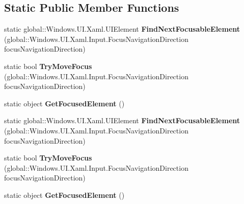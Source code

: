 \subsection*{Static Public Member Functions}
\begin{DoxyCompactItemize}
\item 
\mbox{\label{class_windows_1_1_u_i_1_1_xaml_1_1_input_1_1_focus_manager_a4e3a3d58723cc4a3d351f28c100dd644}} 
static global\+::\+Windows.\+U\+I.\+Xaml.\+U\+I\+Element {\bfseries Find\+Next\+Focusable\+Element} (global\+::\+Windows.\+U\+I.\+Xaml.\+Input.\+Focus\+Navigation\+Direction focus\+Navigation\+Direction)
\item 
\mbox{\label{class_windows_1_1_u_i_1_1_xaml_1_1_input_1_1_focus_manager_ab563de83db92e54ea87ab66f08208a6c}} 
static bool {\bfseries Try\+Move\+Focus} (global\+::\+Windows.\+U\+I.\+Xaml.\+Input.\+Focus\+Navigation\+Direction focus\+Navigation\+Direction)
\item 
\mbox{\label{class_windows_1_1_u_i_1_1_xaml_1_1_input_1_1_focus_manager_a5fac98429232cfe24747a7f58343840d}} 
static object {\bfseries Get\+Focused\+Element} ()
\item 
\mbox{\label{class_windows_1_1_u_i_1_1_xaml_1_1_input_1_1_focus_manager_a4e3a3d58723cc4a3d351f28c100dd644}} 
static global\+::\+Windows.\+U\+I.\+Xaml.\+U\+I\+Element {\bfseries Find\+Next\+Focusable\+Element} (global\+::\+Windows.\+U\+I.\+Xaml.\+Input.\+Focus\+Navigation\+Direction focus\+Navigation\+Direction)
\item 
\mbox{\label{class_windows_1_1_u_i_1_1_xaml_1_1_input_1_1_focus_manager_ab563de83db92e54ea87ab66f08208a6c}} 
static bool {\bfseries Try\+Move\+Focus} (global\+::\+Windows.\+U\+I.\+Xaml.\+Input.\+Focus\+Navigation\+Direction focus\+Navigation\+Direction)
\item 
\mbox{\label{class_windows_1_1_u_i_1_1_xaml_1_1_input_1_1_focus_manager_a5fac98429232cfe24747a7f58343840d}} 
static object {\bfseries Get\+Focused\+Element} ()

\end{DoxyCompactItemize}
